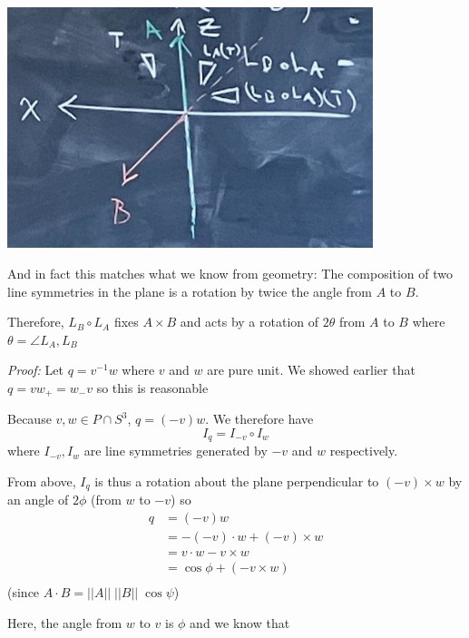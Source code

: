 \documentclass[12pt]{article}
\newcommand{\norm}[1]{\left\vert \left\vert #1 \right\vert \right\vert}
\newcommand{\biject}{\hookrightarrow \hspace{-8pt} \rightarrow}
\newenvironment*{tbox}[2][gray]{
    \begin{tcolorbox}[
        parbox=false,
        colback=#1!5!white,
        colframe=#1!75!black,
        breakable,
        title={#2}
    ]}
    {\end{tcolorbox}}
\begin{document}
    \begin{center}
        \includegraphics[width=0.8\textwidth]{Images/Triangle rotations.png}
    \end{center}


    And in fact this matches what we know from geometry: The composition of two line symmetries in the plane is a rotation by twice the angle from $A$ to $B$. 

    Therefore, $L_B \circ L_A$ fixes $A \times B$ and acts by a rotation of $2\theta$ from $A$ to $B$ where $\theta = \angle L_A, L_B$

    \begin{tbox}{\textbf{Euler-Rodrigues Theorem:} Let $q = \cos \frac{\theta}{2} + u \sin \frac{\theta}{2}$ be a unit quaternion in $S^3$. Then $I_q: P \biject P$ is a rotation about axis $u \in P$ by an angle of $\theta$}
        \emph{Proof:} Let $q = v^{-1}w$ where $v$ and $w$ are pure unit. We showed earlier that $q = vw_+ = w_- v$ so this is reasonable 

        Because $v, w \in P \cap S^3$, $q = (-v)w$. We therefore have 
        \[I_q = I_{-v} \circ I_w\]
        where $I_{-v}, I_w$ are line symmetries generated by $-v$ and $w$ respectively.

        From above, $I_q$ is thus a rotation about the plane perpendicular to $(-v) \times w$ by an angle of $2\phi$ (from $w$ to $-v$) so 
        \begin{align*}
            q &= (-v)w\\ 
            &= -(-v) \cdot w + (-v) \times w\\ 
            &= v \cdot w - v \times w\\ 
            &= \cos \phi + (-v \times w)\\ 
        \end{align*}
        (since $A \cdot B = \norm A\; \norm B\; \cos \psi$) 

        Here, the angle from $w$ to $v$ is $\phi$ and we know that 

    \end{tbox}
\end{document}
